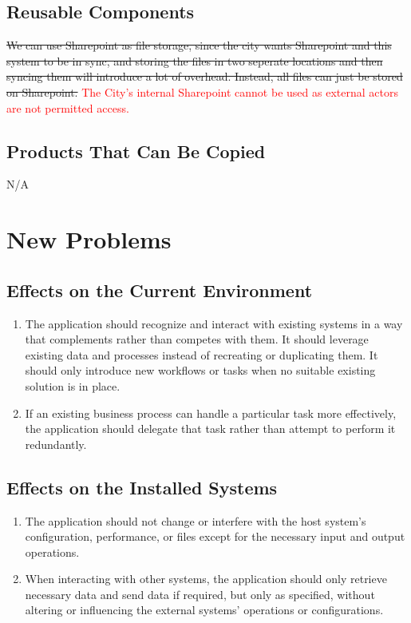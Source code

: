 \documentclass[12pt]{article}
\begin{document}
\subsection{Reusable Components}
\sout{We can use Sharepoint as file storage, since the city wants
  Sharepoint and this
  system to be in sync, and storing the files in two seperate locations and then
  syncing them will introduce a lot of overhead. Instead, all files can just be
stored on Sharepoint.} \textcolor{red}{The City's internal Sharepoint
cannot be used as external actors are not permitted access.}
\subsection{Products That Can Be Copied}
N/A

\section{New Problems}
\subsection{Effects on the Current Environment}
\begin{enumerate}
  \item The application should recognize and interact with existing
    systems in a way that complements rather than competes with them.
    It should leverage existing data and processes instead of
    recreating or duplicating them.
    It should only introduce new workflows or tasks when no suitable
    existing solution is in place.
  \item If an existing business process can handle a particular task
    more effectively, the application should delegate that task
    rather than attempt to perform it redundantly.
\end{enumerate}
\subsection{Effects on the Installed Systems}
\begin{enumerate}
  \item The application should not change or interfere with the host
    system's configuration, performance, or files except for the
    necessary input and output operations.
  \item When interacting with other systems, the application should
    only retrieve necessary data and send data if required, but only
    as specified, without altering or influencing the external
    systems' operations or configurations.
\end{enumerate}
\end{document}
